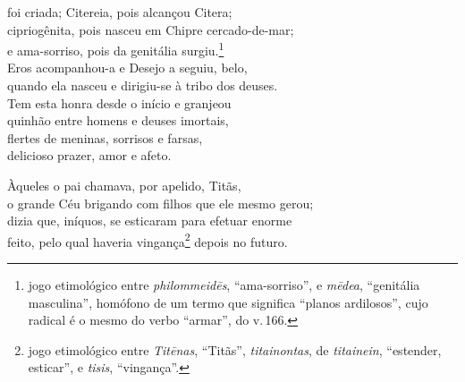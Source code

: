 foi criada; Citereia, pois alcançou Citera;\\
cipriogênita, pois nasceu em Chipre cercado-de-mar;\\
e ama-sorriso, pois da genitália surgiu.\footnote{jogo etimológico entre \emph{philommeidēs}, ``ama-sorriso'', e \emph{mēdea}, ``genitália masculina'', homófono de um termo que significa ``planos ardilosos'', cujo radical é o mesmo do verbo ``armar'', do v.\,166.} \\
Eros acompanhou-a e Desejo a seguiu, belo,\\
quando ela nasceu e dirigiu-se à tribo dos deuses.\\
Tem esta honra desde o início e granjeou\\
quinhão entre homens e deuses imortais,\\
flertes de meninas, sorrisos e farsas, \\
delicioso prazer, amor e afeto.

\quad{}Àqueles o pai chamava, por apelido, Titãs,\\
o grande Céu brigando com filhos que ele mesmo gerou;\\
dizia que, iníquos, se esticaram para efetuar enorme\\
feito, pelo qual haveria vingança\footnote{jogo etimológico entre \emph{Titēnas}, ``Titãs'', \emph{titainontas}, de \emph{titainein}, ``estender, esticar'', e \emph{tisis}, ``vingança''.} depois no futuro. 

